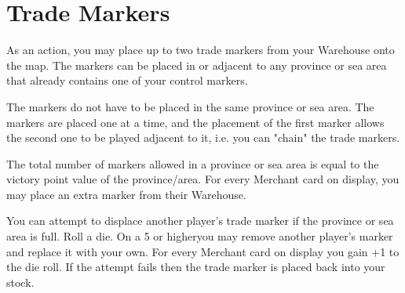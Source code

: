 \section{Trade Markers}

As an action, you may place up to two trade markers from your Warehouse onto the map. The markers can be placed in or adjacent to any province or sea area that already contains one of your control markers.

The markers do not have to be placed in the same province or sea area. The markers are placed one at a time, and the placement of the first marker allows the second one to be played adjacent to it, i.e. you can "chain" the trade markers.

The total number of markers allowed in a province or sea area is equal to the victory point value of the province/area. For every Merchant card on display, you may place an extra marker from their Warehouse.

You can attempt to displace another player’s trade marker if the province or sea area is full. Roll a die. On a 5 or higheryou  may remove another player’s marker and replace it with your own. For every Merchant card on display you gain +1 to the die roll. If the attempt fails then the trade marker is placed back into your stock.